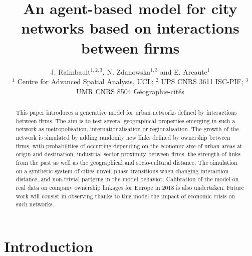 \documentclass[11pt]{article}
\title{An agent-based model for city networks based on interactions between firms}
\date{}
\begin{document}
\author{J. Raimbault$^{1,2,3}$, N. Zdanowska$^{1,3}$ and E. Arcaute$^1$\\\medskip\small
$^{1}$ Centre for Advanced Spatial Analysis, UCL; $^{2}$ UPS CNRS 3611 ISC-PIF; $^{3}$ UMR CNRS 8504 G{\'e}ographie-cit{\'e}s
}

\maketitle

\begin{abstract}
    This paper introduces a generative model for urban networks defined by interactions between firms. The aim is to test several geographical properties emerging in such a network as metropolisation, internationalisation or regionalisation. The growth of the network is simulated by adding randomly new links defined by ownership between firms, with probabilities of occurring depending on the economic size of urban areas at origin and destination, industrial sector proximity between firms, the strength of links from the past as well as the geographical and socio-cultural distance. The simulation on a synthetic system of cities unveil phase transitions when changing interaction distance, and non-trivial patterns in the model behavior. Calibration of the model on real data on company ownership linkages for Europe in 2018 is also undertaken. Future work will consist in observing thanks to this model the impact of economic crisis on such networks.
    
    
\end{abstract}

\section{Introduction}
\end{document}
